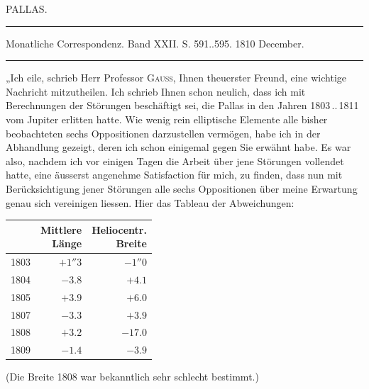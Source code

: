 \par\bigskip
{}
\hypertarget{native-325-lower}{}\label{native-325-lower}
\begin{center}\large PALLAS.\end{center}
\begin{center}
\parbox{.72\linewidth}{%
\centering\fontsize{8.2}{10.2}\selectfont
\hrule height .3pt\relax\vspace{2.5pt}
Monatliche Correspondenz. Band XXII. S. 591..595. 1810 December.\par
\vspace{2.5pt}\hrule height .3pt\relax
}
\end{center}

\par\indent „Ich eile, schrieb Herr Professor \textsc{Gauss}, Ihnen theuerster Freund, eine wichtige Nachricht mitzutheilen. Ich schrieb Ihnen schon neulich, dass ich mit Berechnungen der Störungen beschäftigt sei, die Pallas in den Jahren 1803\,..\,1811 vom Jupiter erlitten hatte. Wie wenig rein elliptische Elemente alle bisher beobachteten sechs Oppositionen darzustellen vermögen, habe ich in der Abhandlung gezeigt, deren ich schon einigemal gegen Sie erwähnt habe. Es war also, nachdem ich vor einigen Tagen die Arbeit über jene Störungen vollendet hatte, eine äusserst angenehme Satisfaction für mich, zu finden, dass nun mit Berücksichtigung jener Störungen alle sechs Oppositionen über meine Erwartung genau sich vereinigen liessen. Hier das Tableau der Abweichungen:

\begin{center}\fontsize{10}{12}\selectfont\setlength{\tabcolsep}{4pt}\renewcommand{\arraystretch}{1.15}\begin{tabular}{r|r|r}
 & \shortstack{Mittlere\\Länge} & \shortstack{Heliocentr.\\Breite}\\\hline
1803 & $+1''3$ & $-1''0$\\
1804 & $-3.8$ & $+4.1$\\
1805 & $+3.9$ & $+6.0$\\
1807 & $-3.3$ & $+3.9$\\
1808 & $+3.2$ & $-17.0$\\
1809 & $-1.4$ & $-3.9$\\
\end{tabular}\end{center}
\noindent (Die Breite 1808 war bekanntlich sehr schlecht bestimmt.)

